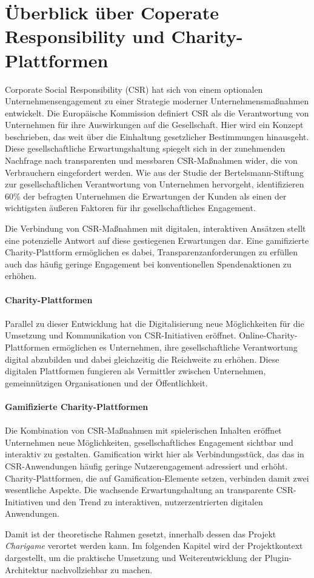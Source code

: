 \section{Überblick über Coperate Responsibility und Charity-Plattformen}
Corporate Social Responsibility (\gls{CSR}) hat sich von einem optionalen Unternehmensengagement zu einer Strategie moderner Unternehmensmaßnahmen entwickelt.
Die Europäische Kommission definiert \gls{CSR} als die Verantwortung von Unternehmen für ihre Auswirkungen auf die Gesellschaft.
Hier wird ein Konzept beschrieben, das weit über die Einhaltung gesetzlicher Bestimmungen hinausgeht.\cite{european_commission2011csr}
Diese gesellschaftliche Erwartungshaltung spiegelt sich in der zunehmenden Nachfrage nach transparenten und messbaren \gls{CSR}-Maßnahmen wider, die von Verbrauchern eingefordert werden.
Wie aus der Studie der Bertelsmann-Stiftung zur gesellschaftlichen Verantwortung von Unternehmen hervorgeht, identifizieren 60\% der befragten Unternehmen die Erwartungen der Kunden als einen der wichtigsten äußeren Faktoren für ihr gesellschaftliches Engagement.\cite{bertelsmann2006gesellschaftliche}

Die Verbindung von \gls{CSR}-Maßnahmen mit digitalen, interaktiven Ansätzen stellt eine potenzielle Antwort auf diese gestiegenen Erwartungen dar.
Eine gamifizierte Charity-Plattform ermöglichen es dabei, Transparenzanforderungen zu erfüllen auch das häufig geringe Engagement bei konventionellen Spendenaktionen zu erhöhen.
\\\\
\textbf{Charity-Plattformen}
\\\\
Parallel zu dieser Entwicklung hat die Digitalisierung neue Möglichkeiten für die Umsetzung und Kommunikation von \gls{CSR}-Initiativen eröffnet.
Online-Charity-Plattformen ermöglichen es Unternehmen, ihre gesellschaftliche Verantwortung digital abzubilden und dabei gleichzeitig die Reichweite zu erhöhen.
Diese digitalen Plattformen fungieren als Vermittler zwischen Unternehmen, gemeinnützigen Organisationen und der Öffentlichkeit.
\\\\
\textbf{Gamifizierte Charity-Plattformen} \\\\
Die Kombination von \gls{CSR}-Maßnahmen mit spielerischen Inhalten eröffnet Unternehmen neue Möglichkeiten, gesellschaftliches Engagement sichtbar und interaktiv zu gestalten.
Gamification wirkt hier als Verbindungsstück, das das in \gls{CSR}-Anwendungen häufig geringe Nutzerengagement adressiert und erhöht.
Charity-Plattformen, die auf Gamification-Elemente setzen, verbinden damit zwei wesentliche Aspekte.
Die wachsende Erwartungshaltung an transparente \gls{CSR}-Initiativen und den Trend zu interaktiven, nutzerzentrierten digitalen Anwendungen.

Damit ist der theoretische Rahmen gesetzt, innerhalb dessen das Projekt \textit{Charigame} verortet werden kann.
Im folgenden Kapitel wird der Projektkontext dargestellt, um die praktische Umsetzung und Weiterentwicklung der \gls{Plugin}-Architektur nachvollziehbar zu machen.